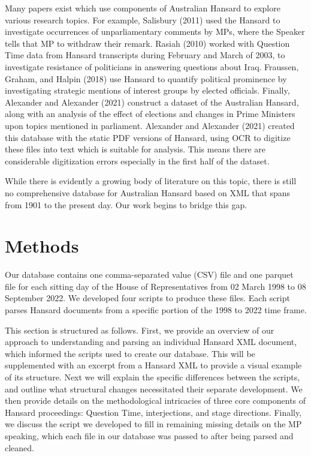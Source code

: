 \documentclass[
  letterpaper,
  DIV=11,
  numbers=noendperiod]{scrartcl}
\begin{document}
Many papers exist which use components of Australian Hansard to explore
various research topics. For example, Salisbury (2011) used the Hansard
to investigate occurrences of unparliamentary comments by MPs, where the
Speaker tells that MP to withdraw their remark. Rasiah (2010) worked
with Question Time data from Hansard transcripts during February and
March of 2003, to investigate resistance of politicians in answering
questions about Iraq. Fraussen, Graham, and Halpin (2018) use Hansard to
quantify political prominence by investigating strategic mentions of
interest groups by elected officials. Finally, Alexander and Alexander
(2021) construct a dataset of the Australian Hansard, along with an
analysis of the effect of elections and changes in Prime Ministers upon
topics mentioned in parliament. Alexander and Alexander (2021) created
this database with the static PDF versions of Hansard, using OCR to
digitize these files into text which is suitable for analysis. This
means there are considerable digitization errors especially in the first
half of the dataset.

While there is evidently a growing body of literature on this topic,
there is still no comprehensive database for Australian Hansard based on
XML that spans from 1901 to the present day. Our work begins to bridge
this gap.

\hypertarget{methods}{%
\section{Methods}\label{methods}}

Our database contains one comma-separated value (CSV) file and one
parquet file for each sitting day of the House of Representatives from
02 March 1998 to 08 September 2022. We developed four scripts to produce
these files. Each script parses Hansard documents from a specific
portion of the 1998 to 2022 time frame.

This section is structured as follows. First, we provide an overview of
our approach to understanding and parsing an individual Hansard XML
document, which informed the scripts used to create our database. This
will be supplemented with an excerpt from a Hansard XML to provide a
visual example of its structure. Next we will explain the specific
differences between the scripts, and outline what structural changes
necessitated their separate development. We then provide details on the
methodological intricacies of three core components of Hansard
proceedings: Question Time, interjections, and stage directions.
Finally, we discuss the script we developed to fill in remaining missing
details on the MP speaking, which each file in our database was passed
to after being parsed and cleaned.
\end{document}

